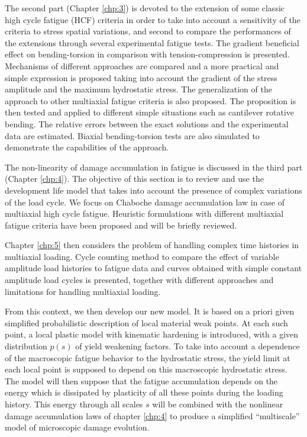The second part (Chapter \ref{chp:3}) is devoted to the extension of some classic high cycle fatigue (HCF) criteria in order  to take into account a sensitivity of the criteria to stress spatial variations, and second to compare the performances of the extensions through several experimental fatigue tests. The gradient beneficial effect on bending-torsion in comparison with tension-compression is presented. Mechanisms of different approaches are compared and a more practical and simple expression is proposed taking into account the gradient of the stress amplitude and the maximum hydrostatic stress. The generalization of the approach to other multiaxial fatigue criteria is also proposed.  The proposition is then tested and applied to different simple situations such as cantilever rotative bending. The relative errors between the exact solutions and the experimental data are estimated. Biaxial  bending-torsion tests are also simulated to demonstrate the capabilities of the approach. 

The non-linearity of damage accumulation in fatigue is discussed in the third part (Chapter \ref{chp:4}). The objective of this section is to review and use the development life model that takes into account the presence of complex variations of the load cycle. We focus on Chaboche damage accumulation law in case of multiaxial high cycle fatigue. Heuristic formulations with different multiaxial fatigue criteria have been proposed and will be briefly reviewed.

Chapter \ref{chp:5} then considers the problem of handling complex time histories in multiaxial loading. 
Cycle counting method to compare the effect of variable amplitude load histories to fatigue data and curves obtained with simple constant amplitude load cycles is presented, together with different approaches and limitations for handling multiaxial loading.

From this context, we then develop our new model. It is based on a priori given simplified probabilistic description of local material weak points. At each such point, a local plastic model with kinematic hardening is introduced, with a given distribution $p(s)$ of yield weakening factors. To take into account a dependence of the macroscopic fatigue behavior to the hydrostatic stress, the yield limit at each local point is supposed to depend on this macroscopic hydrostatic stress. The model will then suppose that the fatigue accumulation depends on the energy which is dissipated by plasticity of all these points during the loading history.  This energy through all scales $s$ will be combined with the nonlinear damage accumulation laws of chapter \ref{chp:4} to produce a simplified ``multiscale'' model of microscopic damage evolution.

